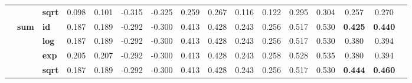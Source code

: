 \begin{table}[t]
{\begin{tabular}{cclccccccccccccc}
              & & \textbf{sqrt} & 0.098 & 0.101 & -0.315 & -0.325 & 0.259 & 0.267 & 0.116 & 0.122 & 0.295 & 0.304 & 0.257 & 0.270 \\
      \cmidrule{2-15}
      & \multirow{4}{*}{\textbf{sum}}
                & \textbf{id}   & 0.187 & 0.189 & -0.292 & -0.300 & 0.413 & 0.428 & 0.243 & 0.256 & 0.517 & 0.530 & \textbf{0.425} & \textbf{0.440} \\
              & & \textbf{log}  & 0.187 & 0.189 & -0.292 & -0.300 & 0.413 & 0.428 & 0.243 & 0.256 & 0.517 & 0.530 & 0.380 & 0.394 \\
              & & \textbf{exp}  & 0.205 & 0.207 & -0.292 & -0.300 & 0.413 & 0.428 & 0.243 & 0.258 & 0.528 & 0.535 & 0.380 & 0.394 \\
              & & \textbf{sqrt} & 0.187 & 0.189 & -0.292 & -0.300 & 0.413 & 0.428 & 0.243 & 0.256 & 0.517 & 0.530 & \textbf{0.444} & \textbf{0.460} \\
      \midrule


\end{tabular}}
\end{table}
